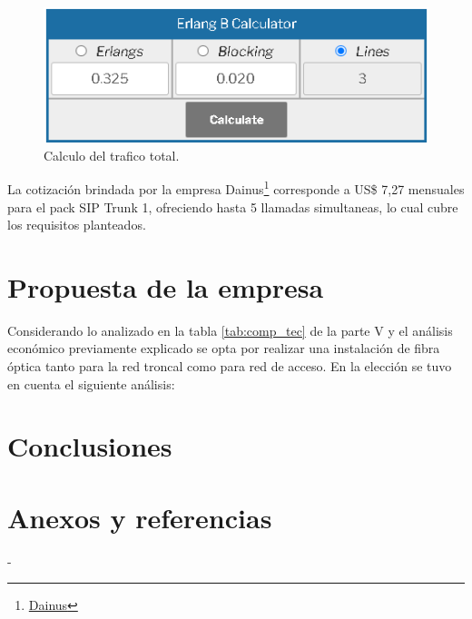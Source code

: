 \documentclass[11pt,a4paper]{article}
\begin{document}
\begin{figure}[htbp]
  \centering
  \includegraphics[width=0.6\linewidth]{fotos_ema/erlang.png}
  \caption{Calculo del trafico total.}
  \label{fig:erla}
\end{figure}

La cotización brindada por la empresa Dainus\footnote{\href{https://dainus.net/sip}{Dainus}} corresponde a US\$ 7,27 mensuales para el pack SIP Trunk 1, ofreciendo hasta 5 llamadas simultaneas, lo cual cubre los requisitos planteados.   



\part{Propuesta de la empresa}

Considerando lo analizado en la tabla \ref{tab:comp_tec} de la parte V y el análisis económico previamente explicado se opta por realizar una instalación de fibra óptica tanto para la red troncal como para red de acceso.
En la elección se tuvo en cuenta el siguiente análisis: 





\part{Conclusiones}

\part{Anexos y referencias}

-
\end{document}
